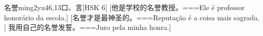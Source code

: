 \begin{EntryWithPhonetic}{名誉}{ming2yu4}{6,13}{⼝、⾔}[HSK 6]
  [他是学校的名誉教授。===Ele é professor honorário da escola.]
  [名誉才是最神圣的。===Reputação é a coisa mais sagrada. | 我用自己的名誉发誓。===Juro pela minha honra.]
\end{EntryWithPhonetic}

